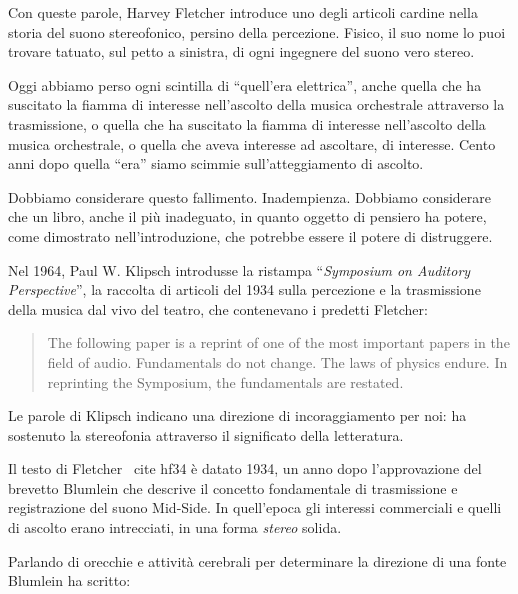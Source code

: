Con queste parole, Harvey Fletcher introduce uno degli articoli cardine nella
storia del suono stereofonico, persino della percezione. Fisico, il suo nome lo
puoi trovare tatuato, sul petto a sinistra, di ogni ingegnere del suono vero
stereo.

Oggi abbiamo perso ogni scintilla di “quell'era elettrica”, anche quella che ha
suscitato la fiamma di interesse nell'ascolto della musica orchestrale
attraverso la trasmissione, o quella che ha suscitato la fiamma di interesse
nell'ascolto della musica orchestrale, o quella che aveva interesse ad
ascoltare, di interesse. Cento anni dopo quella “era” siamo scimmie
sull'atteggiamento di ascolto.

Dobbiamo considerare questo fallimento. Inadempienza. Dobbiamo considerare che
un libro, anche il più inadeguato, in quanto oggetto di pensiero ha potere, come
dimostrato nell'introduzione, che potrebbe essere il potere di distruggere.

Nel 1964, Paul W. Klipsch introdusse la ristampa “\emph{Symposium on Auditory
Perspective}”, la raccolta di articoli del 1934 sulla percezione e la
trasmissione della musica dal vivo del teatro, che contenevano i predetti
Fletcher:

\begin{quotation}
The following paper is a reprint of one of the most important papers in the
field of audio. Fundamentals do not change. The laws of physics endure. In
reprinting the Symposium, the fundamentals are restated. \cite{sap1964}
\end{quotation}

Le parole di Klipsch indicano una direzione di incoraggiamento per noi: ha
sostenuto la stereofonia attraverso il significato della letteratura.

Il testo di Fletcher \ cite {hf34} è datato 1934, un anno dopo l'approvazione
del brevetto Blumlein che descrive il concetto fondamentale di trasmissione e
registrazione del suono Mid-Side. In quell'epoca gli interessi commerciali e
quelli di ascolto erano intrecciati, in una forma \emph{stereo} solida.

Parlando di orecchie e attività cerebrali per determinare la direzione di una
fonte Blumlein ha scritto:

